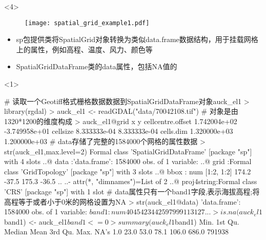 \begin{frame}[t,fragile]{\subsecname}{\subsubsecname}
\begin{overlayarea}{\textwidth}{\textheight}
\begin{onlyenv}<4>
\begin{figure}[ht] \vspace{-10pt}
  \texttt{[image: spatial\_grid\_example1.pdf]}
\end{figure}
\end{onlyenv}
\end{overlayarea}
\end{frame}

\begin{frame}[t,fragile]{\subsecname}{\subsubsecname}
\begin{itemize}
\item<1-> sp包提供类将SpatialGrid对象转换为类似data.frame数据结构，用于挂载网格上的属性，例如高程、温度、风力、颜色等
\item<1-> SpatialGridDataFrame类的data属性，包括NA值的
\end{itemize}

\begin{overlayarea}{\textwidth}{\textheight}
\begin{onlyenv}<1>
\begin{rcode}
# 读取一个Geotiff格式栅格数据数据到SpatialGridDataFrame对象auck\_el1
> library(rgdal)
> auck_el1 <- readGDAL("data/70042108.tif")
# 对象是由1320*1200的维度构成
> auck_el1@grid
                             x             y
cellcentre.offset 1.742004e+02 -3.749958e+01
cellsize          8.333333e-04  8.333333e-04
cells.dim         1.320000e+03  1.200000e+03
# data存储了完整的1584000个网格的属性数据
> str(auck_el1,max.level=2)
Formal class 'SpatialGridDataFrame' [package "sp"] with 4 slots
  ..@ data       :'data.frame': 1584000 obs. of  1 variable:
  ..@ grid       :Formal class 'GridTopology' [package "sp"] with 3 slots
  ..@ bbox       : num [1:2, 1:2] 174.2 -37.5 175.3 -36.5
  .. ..- attr(*, "dimnames")=List of 2
  ..@ proj4string:Formal class 'CRS' [package "sp"] with 1 slot
# data属性只有一个band1字段,表示海拔高程;将高程等于或者小于0米的网格设置为NA
> str(auck_el1@data)
'data.frame':   1584000 obs. of  1 variable:
 $ band1: num  40 45 42 34 42 59 79 99 113 127 ... 
> is.na(auck_el1$band1) <- auck_el1$band1 <= 0
> summary(auck_el1$band1)
   Min. 1st Qu.  Median    Mean 3rd Qu.    Max.    NA's 
    1.0    23.0    53.0    78.1   106.0   686.0  791938 
\end{rcode}
\end{onlyenv}
\end{overlayarea}
\end{frame}

